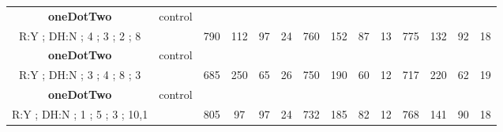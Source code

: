 \begin{table}[H]
{\begin{tabular}{|c|c|c|c|c|c|c|c|c|c|c|c|c|c|}
\cellcolor{blue!15}\textbf{oneDotTwo} & control& {\color[HTML]{00009B} } & {\color[HTML]{9A0000} } & {\color[HTML]{009901} } &  & {\color[HTML]{00009B} } & {\color[HTML]{9A0000} } & {\color[HTML]{009901} } &  & {\color[HTML]{00009B} } & {\color[HTML]{9A0000} } & {\color[HTML]{009901} } &  \\ 
\cellcolor{ blue!15}R:Y ; DH:N ; 4 ; 3 ; 2 ; 8 &  & \multirow{-2}{*}{{\color[HTML]{00009B} 790}} & \multirow{-2}{*}{{\color[HTML]{9A0000} 112}} & \multirow{-2}{*}{{\color[HTML]{009901} 97}} & \multirow{-2}{*}{24} & \multirow{-2}{*}{{\color[HTML]{00009B} 760}} & \multirow{-2}{*}{{\color[HTML]{9A0000} 152}} & \multirow{-2}{*}{{\color[HTML]{009901} 87}} & \multirow{-2}{*}{13} & \multirow{-2}{*}{{\color[HTML]{00009B} 775}} & \multirow{-2}{*}{{\color[HTML]{9A0000} 132}} & \multirow{-2}{*}{{\color[HTML]{009901} 92}} & \multirow{-2}{*}{18} \\ \hline

\cellcolor{blue!15}\textbf{oneDotTwo} & control& {\color[HTML]{00009B} } & {\color[HTML]{9A0000} } & {\color[HTML]{009901} } &  & {\color[HTML]{00009B} } & {\color[HTML]{9A0000} } & {\color[HTML]{009901} } &  & {\color[HTML]{00009B} } & {\color[HTML]{9A0000} } & {\color[HTML]{009901} } &  \\ 
\cellcolor{ blue!15}R:Y ; DH:N ; 3 ; 4 ; 8 ; 3 &  & \multirow{-2}{*}{{\color[HTML]{00009B} 685}} & \multirow{-2}{*}{{\color[HTML]{9A0000} 250}} & \multirow{-2}{*}{{\color[HTML]{009901} 65}} & \multirow{-2}{*}{26} & \multirow{-2}{*}{{\color[HTML]{00009B} 750}} & \multirow{-2}{*}{{\color[HTML]{9A0000} 190}} & \multirow{-2}{*}{{\color[HTML]{009901} 60}} & \multirow{-2}{*}{12} & \multirow{-2}{*}{{\color[HTML]{00009B} 717}} & \multirow{-2}{*}{{\color[HTML]{9A0000} 220}} & \multirow{-2}{*}{{\color[HTML]{009901} 62}} & \multirow{-2}{*}{19} \\ \hline

\cellcolor{blue!15}\textbf{oneDotTwo} & control& {\color[HTML]{00009B} } & {\color[HTML]{9A0000} } & {\color[HTML]{009901} } &  & {\color[HTML]{00009B} } & {\color[HTML]{9A0000} } & {\color[HTML]{009901} } &  & {\color[HTML]{00009B} } & {\color[HTML]{9A0000} } & {\color[HTML]{009901} } &  \\ 
\cellcolor{ blue!15}R:Y ; DH:N ; 1 ; 5 ; 3 ; 10,1 &  & \multirow{-2}{*}{{\color[HTML]{00009B} 805}} & \multirow{-2}{*}{{\color[HTML]{9A0000} 97}} & \multirow{-2}{*}{{\color[HTML]{009901} 97}} & \multirow{-2}{*}{24} & \multirow{-2}{*}{{\color[HTML]{00009B} 732}} & \multirow{-2}{*}{{\color[HTML]{9A0000} 185}} & \multirow{-2}{*}{{\color[HTML]{009901} 82}} & \multirow{-2}{*}{12} & \multirow{-2}{*}{{\color[HTML]{00009B} 768}} & \multirow{-2}{*}{{\color[HTML]{9A0000} 141}} & \multirow{-2}{*}{{\color[HTML]{009901} 90}} & \multirow{-2}{*}{18} \\ \hline


\end{tabular}}
\end{table}
